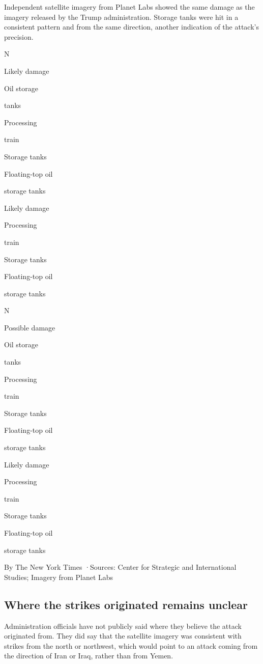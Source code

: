 Independent satellite imagery from Planet Labs showed the same damage as
the imagery released by the Trump administration. Storage tanks were hit
in a consistent pattern and from the same direction, another indication
of the attack's precision.

N

Likely damage

Oil storage

tanks

Processing

train

Storage tanks

Floating-top oil

storage tanks

Likely damage

Processing

train

Storage tanks

Floating-top oil

storage tanks

N

Possible damage

Oil storage

tanks

Processing

train

Storage tanks

Floating-top oil

storage tanks

Likely damage

Processing

train

Storage tanks

Floating-top oil

storage tanks

By The New York Times ·Sources: Center for Strategic and International
Studies; Imagery from Planet Labs

\hypertarget{where-the-strikes-originated-remains-unclear}{%
\subsection{Where the strikes originated remains
unclear}\label{where-the-strikes-originated-remains-unclear}}

Administration officials have not publicly said where they believe the
attack originated from. They did say that the satellite imagery was
consistent with strikes from the north or northwest, which would point
to an attack coming from the direction of Iran or Iraq, rather than from
Yemen.

